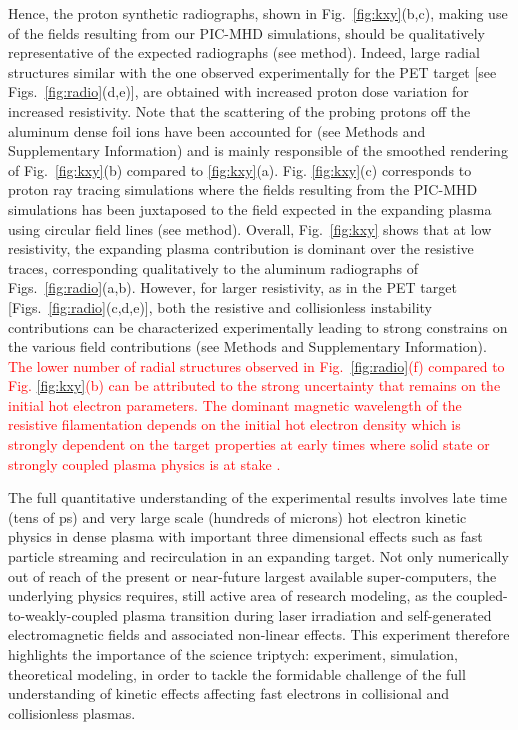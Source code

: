 \documentclass[aps,twocolumn,showpacs,superscriptaddress]{revtex4}
\begin{document}
Hence, the proton synthetic radiographs, shown in Fig.~\ref{fig:kxy}(b,c), making use of the fields resulting from our PIC-MHD simulations, should be qualitatively representative of the expected radiographs (see method). Indeed,  large radial structures similar with the one observed experimentally for the PET target [see Figs.~\ref{fig:radio}(d,e)],  are obtained with increased  proton dose variation for increased resistivity. Note that the scattering of the probing protons off the aluminum dense foil ions have been accounted for (see Methods and Supplementary Information) and is mainly responsible of the smoothed rendering of Fig.~\ref{fig:kxy}(b) compared to \ref{fig:kxy}(a).
Fig. \ref{fig:kxy}(c) corresponds to proton ray tracing simulations where the fields resulting from the PIC-MHD simulations has been juxtaposed to the field expected in the expanding plasma using circular field lines (see method). 
Overall, Fig.~\ref{fig:kxy} shows that at low resistivity, the expanding plasma contribution is dominant over the resistive traces, corresponding qualitatively to the aluminum radiographs of Figs.~\ref{fig:radio}(a,b). However, for larger resistivity, as in the PET target [Figs.~\ref{fig:radio}(c,d,e)], both the resistive and collisionless instability  contributions can be characterized experimentally  leading to strong constrains on the various field contributions (see Methods and Supplementary Information).
\textcolor{red}{
The lower number of radial structures observed in Fig.~\ref{fig:radio}(f) compared to   Fig. \ref{fig:kxy}(b) can be attributed to the strong uncertainty that remains on the initial hot electron parameters. The dominant magnetic wavelength of the resistive filamentation depends on the initial hot electron density which is   strongly dependent on the target properties at  early times where   solid state or strongly coupled plasma physics is at stake \cite{}. 
 }
 
The full quantitative understanding of the experimental results involves late time (tens of ps) and very large scale (hundreds of microns) hot electron kinetic physics in dense plasma  with important three dimensional  effects such as fast particle streaming and recirculation in an expanding target.
Not only numerically out of reach of the present or near-future largest available super-computers, the  underlying physics requires, still active area of research modeling, as the coupled-to-weakly-coupled plasma transition during laser irradiation  and self-generated electromagnetic fields and associated non-linear effects.
This experiment therefore highlights the importance of the science triptych:  experiment, simulation, theoretical modeling, in order  to tackle the formidable challenge of the  full understanding of kinetic effects affecting fast electrons in collisional and collisionless plasmas.
\end{document}
